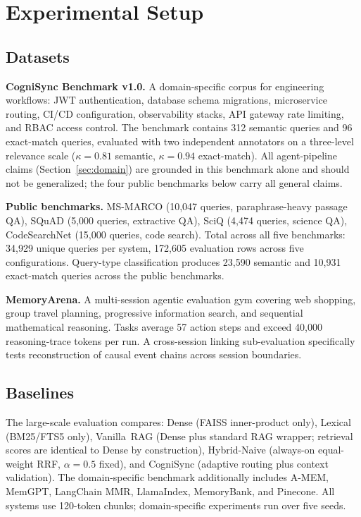 \documentclass[sigconf,authordraft]{acmart}
\begin{document}
\section{Experimental Setup}

\subsection{Datasets}

\textbf{CogniSync Benchmark v1.0.} A domain-specific corpus for
engineering workflows: JWT authentication, database schema migrations,
microservice routing, CI/CD configuration, observability stacks, API
gateway rate limiting, and RBAC access control. The benchmark contains
312 semantic queries and 96 exact-match queries, evaluated with two
independent annotators on a three-level relevance scale
($\kappa = 0.81$ semantic, $\kappa = 0.94$ exact-match). All agent-pipeline
claims (Section~\ref{sec:domain}) are grounded in this benchmark alone and
should not be generalized; the four public benchmarks below carry all
general claims.

\textbf{Public benchmarks.} MS-MARCO (10,047 queries, paraphrase-heavy
passage QA), SQuAD (5,000 queries, extractive QA), SciQ (4,474 queries,
science QA), CodeSearchNet (15,000 queries, code search). Total across
all five benchmarks: 34,929 unique queries per system, 172,605 evaluation rows
across five configurations. Query-type classification produces 23,590
semantic and 10,931 exact-match queries across the public benchmarks.

\textbf{MemoryArena.} A multi-session agentic evaluation gym covering
web shopping, group travel planning, progressive information search, and
sequential mathematical reasoning. Tasks average 57 action steps and
exceed 40,000 reasoning-trace tokens per run. A cross-session linking
sub-evaluation specifically tests reconstruction of causal event chains
across session boundaries.

\subsection{Baselines}

The large-scale evaluation compares: Dense (FAISS inner-product only),
Lexical (BM25/FTS5 only), Vanilla~RAG (Dense plus standard RAG wrapper;
retrieval scores are identical to Dense by construction), Hybrid-Naive
(always-on equal-weight RRF, $\alpha=0.5$ fixed), and CogniSync
(adaptive routing plus context validation). The domain-specific benchmark
additionally includes A-MEM, MemGPT, LangChain MMR, LlamaIndex,
MemoryBank, and Pinecone. All systems use 120-token chunks; domain-specific
experiments run over five seeds.
\end{document}
